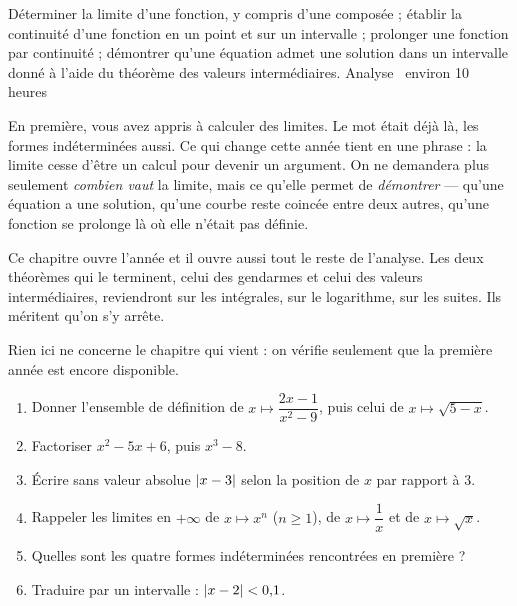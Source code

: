   {Déterminer la limite d'une fonction, y compris d'une composée ; établir la
   continuité d'une fonction en un point et sur un intervalle ; prolonger une
   fonction par continuité ; démontrer qu'une équation admet une solution dans
   un intervalle donné à l'aide du théorème des valeurs intermédiaires.}
  {Analyse \textbullet\ environ 10 heures}

En première, vous avez appris à calculer des limites. Le mot était déjà là,
les formes indéterminées aussi. Ce qui change cette année tient en une
phrase : la limite cesse d'être un calcul pour devenir un argument. On ne
demandera plus seulement \emph{combien vaut} la limite, mais ce qu'elle permet
de \emph{démontrer} — qu'une équation a une solution, qu'une courbe reste
coincée entre deux autres, qu'une fonction se prolonge là où elle n'était pas
définie.

Ce chapitre ouvre l'année et il ouvre aussi tout le reste de l'analyse. Les
deux théorèmes qui le terminent, celui des gendarmes et celui des valeurs
intermédiaires, reviendront sur les intégrales, sur le logarithme, sur les
suites. Ils méritent qu'on s'y arrête.

\begin{revision}
Rien ici ne concerne le chapitre qui vient : on vérifie seulement que la
première année est encore disponible.

\begin{enumerate}[label=\textbf{\arabic*.}, leftmargin=*, itemsep=0.35em]
  \item Donner l'ensemble de définition de $x \mapsto \dfrac{2x-1}{x^{2}-9}$,
        puis celui de $x \mapsto \sqrt{5-x}$.
  \item Factoriser $x^{2}-5x+6$, puis $x^{3}-8$.
  \item Écrire sans valeur absolue $\left|x-3\right|$ selon la position de $x$ par
        rapport à $3$.
  \item Rappeler les limites en $+\infty$ de $x \mapsto x^{n}$ ($n \geq 1$),
        de $x \mapsto \dfrac{1}{x}$ et de $x \mapsto \sqrt{x}$.
  \item Quelles sont les quatre formes indéterminées rencontrées en première ?
  \item Traduire par un intervalle : $\left|x-2\right| < 0{,}1$.
\end{enumerate}
\end{revision}


